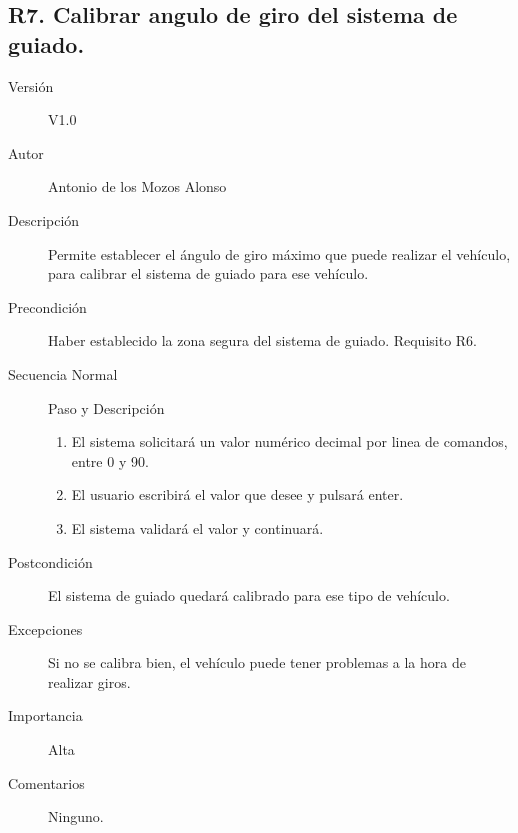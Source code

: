 \subsection{R7. Calibrar angulo de giro del sistema de guiado.}
\begin{description}
	\item [Versión] V1.0
	\item [Autor] Antonio de los Mozos Alonso
	\item [Descripción] Permite establecer el ángulo de giro máximo que puede realizar el vehículo, para calibrar el sistema de guiado para ese vehículo.
	\item [Precondición] Haber establecido la zona segura del sistema de guiado. Requisito R6.
	\item [Secuencia Normal] Paso y Descripción
		\begin{enumerate}
			\item El sistema solicitará un valor numérico decimal por linea de comandos, entre 0 y 90.
			\item El usuario escribirá el valor que desee y pulsará enter.
			\item El sistema validará el valor y continuará.
		\end{enumerate}
	\item [Postcondición] El sistema de guiado quedará calibrado para ese tipo de vehículo.
	\item [Excepciones] Si no se calibra bien, el vehículo puede tener problemas a la hora de realizar giros.
	\item [Importancia] Alta
	\item [Comentarios] Ninguno.
\end{description}

